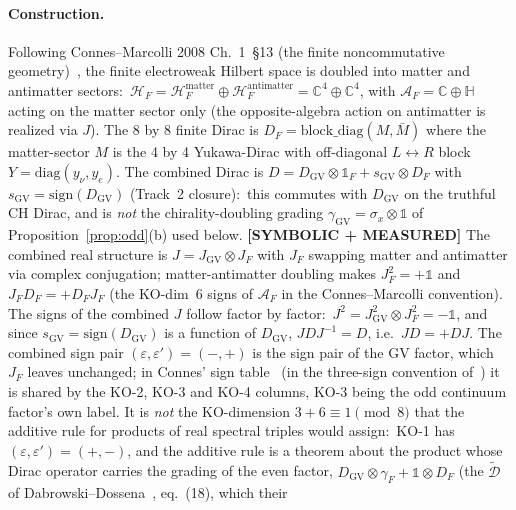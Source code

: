 \documentclass[11pt]{article}
\begin{document}
\paragraph{Construction.}  Following Connes--Marcolli 2008
Ch.~1~\S 13 (the finite noncommutative
geometry)~\cite{connes_marcolli2008}, the finite electroweak Hilbert
space is doubled into matter and antimatter sectors:\ $\mathcal{H}_F
= \mathcal{H}_F^{\mathrm{matter}} \oplus
\mathcal{H}_F^{\mathrm{antimatter}} = \mathbb{C}^4 \oplus \mathbb{C}^4$,
with $\mathcal{A}_F = \mathbb{C} \oplus \mathbb{H}$ acting on the
matter sector only (the opposite-algebra action on antimatter is
realized via $J$).  The 8 by 8 finite Dirac is $D_F =
\mathrm{block\_diag}(M, \bar{M})$ where the matter-sector $M$ is the
4 by 4 Yukawa-Dirac with off-diagonal $L \leftrightarrow R$ block
$Y = \mathrm{diag}(y_\nu, y_e)$.  The combined Dirac is $D =
D_{\mathrm{GV}} \otimes \mathbb{1}_F + s_{\mathrm{GV}} \otimes
D_F$ with $s_{\mathrm{GV}} = \mathrm{sign}(D_{\mathrm{GV}})$
(Track~2 closure):\ this commutes with $D_{\mathrm{GV}}$ on the
truthful CH Dirac, and is \emph{not} the chirality-doubling grading
$\gamma_{\mathrm{GV}} = \sigma_x \otimes \mathbb{1}$ of
Proposition~\ref{prop:odd}(b) used below.  \textbf{[SYMBOLIC + MEASURED]} The combined real structure is $J = J_{\mathrm{GV}}
\otimes J_F$ with $J_F$ swapping matter and antimatter via complex
conjugation; matter-antimatter doubling makes $J_F^2 = +\mathbb{1}$
and $J_F D_F = +D_F J_F$ (the KO-dim~6 signs of $\mathcal{A}_F$ in the
Connes--Marcolli convention).  The signs of the combined $J$ follow
factor by factor:\ $J^2 = J_{\mathrm{GV}}^2 \otimes J_F^2 =
-\mathbb{1}$, and since $s_{\mathrm{GV}} =
\mathrm{sign}(D_{\mathrm{GV}})$ is a function of $D_{\mathrm{GV}}$,
$J D J^{-1} = D$, i.e.\ $J D = +D J$.  The combined sign pair
$(\varepsilon, \varepsilon') = (-, +)$ is the sign pair of the GV factor,
which $J_F$ leaves unchanged; in Connes' sign table~\cite{connes1995}
(in the three-sign convention of~\cite{vansuijlekom_book2015}) it is
shared by the KO-2, KO-3 and KO-4 columns, KO-3 being the odd continuum
factor's own label.  It is \emph{not} the KO-dimension $3 + 6
\equiv 1 \pmod 8$ that the additive rule for products of real spectral
triples would assign:\ KO-1 has $(\varepsilon, \varepsilon') = (+, -)$,
and the additive rule is a theorem about the product whose Dirac
operator carries the grading of the even factor, $D_{\mathrm{GV}}
\otimes \gamma_F + \mathbb{1} \otimes D_F$
(the $\widetilde{\mathcal{D}}$ of
Dabrowski--Dossena~\cite{dabrowski_dossena2011}, eq.~(18), which their
\end{document}
